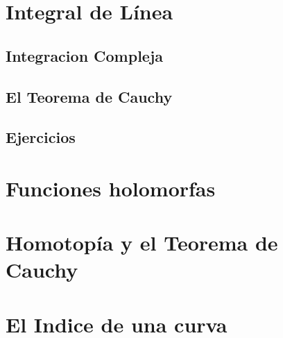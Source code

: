 \documentclass[]{book}
\theoremstyle{definition}
\theoremstyle{definition}
\theoremstyle{definition}
\theoremstyle{remark}
\begin{document}
\hypertarget{integral-de-luxednea}{%
\chapter{Integral de Línea}\label{integral-de-luxednea}}

\hypertarget{integracion-compleja}{%
\section{Integracion Compleja}\label{integracion-compleja}}

\hypertarget{el-teorema-de-cauchy}{%
\section{El Teorema de Cauchy}\label{el-teorema-de-cauchy}}

\hypertarget{ejercicios-3}{%
\section{Ejercicios}\label{ejercicios-3}}

\hypertarget{funciones-holomorfas}{%
\chapter{Funciones holomorfas}\label{funciones-holomorfas}}

\hypertarget{homotopuxeda-y-el-teorema-de-cauchy}{%
\chapter{Homotopía y el Teorema de Cauchy}\label{homotopuxeda-y-el-teorema-de-cauchy}}

\hypertarget{el-indice-de-una-curva}{%
\chapter{El Indice de una curva}\label{el-indice-de-una-curva}}


\end{document}

